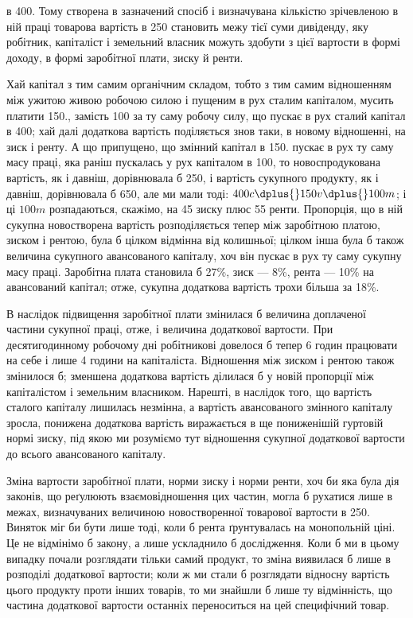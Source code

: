 \parcont{}  %
в 400. Тому створена в зазначений спосіб і визначувана кількістю зрічевленою
в ній праці товарова вартість в 250 становить межу тієї суми дивіденду,
яку робітник, капіталіст і земельний власник можуть здобути з цієї вартости
в формі доходу, в формі заробітної плати, зиску й ренти.

Хай капітал з тим самим органічним складом, тобто з тим самим відношенням
між ужитою живою робочою силою і пущеним в рух сталим капіталом,
мусить платити 150., замість 100 за ту саму робочу силу,
що пускає в рух сталий капітал в 400; хай далі додаткова вартість поділяється
знов таки, в новому відношенні, на зиск і ренту. А що припущено,
що змінний капітал в 150. пускає в рух ту саму масу праці,
яка раніш пускалась у рух капіталом в 100, то новоспродукована вартість, як
і давніш, дорівнювала б 250, і вартість сукупного продукту, як і давніш, дорівнювала
б 650, але ми мали тоді: $400c \dplus{} 150v \dplus{} 100m$; і ці $100m$ розпадаються,
скажімо, на 45 зиску плюс 55 ренти. Пропорція, що в ній сукупна новостворена
вартість розподіляється тепер між заробітною платою, зиском і рентою,
була б цілком відмінна від колишньої; цілком інша була б також величина
сукупного авансованого капіталу, хоч він пускає в рух ту саму сукупну масу
праці. Заробітна плата становила б 27\%, зиск — 8\%, рента — 10\% на
авансований капітал; отже, сукупна додаткова вартість трохи більша за 18\%.

В наслідок підвищення заробітної плати змінилася б величина доплаченої
частини сукупної праці, отже, і величина додаткової вартости. При десятигодинному
робочому дні робітникові довелося б тепер 6 годин працювати на
себе і лише 4 години на капіталіста. Відношення між зиском і рентою також
змінилося б; зменшена додаткова вартість ділилася б у новій пропорції між
капіталістом і земельним власником. Нарешті, в наслідок того, що вартість
сталого капіталу лишилась незмінна, а вартість авансованого змінного капіталу
зросла, понижена додаткова вартість виражається в ще пониженішій гуртовій
нормі зиску, під якою ми розуміємо тут відношення сукупної додаткової вартости
до всього авансованого капіталу.

Зміна вартости заробітної плати, норми зиску і норми ренти, хоч би яка
була дія законів, що реґулюють взаємовідношення цих частин, могла б рухатися
лише в межах, визначуваних величиною новостворенної товарової вартости
в 250. Виняток міг би бути лише тоді, коли б рента ґрунтувалась на
монопольній ціні. Це не відмінімо б закону, а лише ускладнило б дослідження.
Коли б ми в цьому випадку почали розглядати тільки самий продукт, то зміна
виявилася б лише в розподілі додаткової вартости; коли ж ми стали б розглядати
відносну вартість цього продукту проти інших товарів, то ми знайшли б
лише ту відмінність, що частина додаткової вартости останніх переноситься на
цей специфічний товар.

